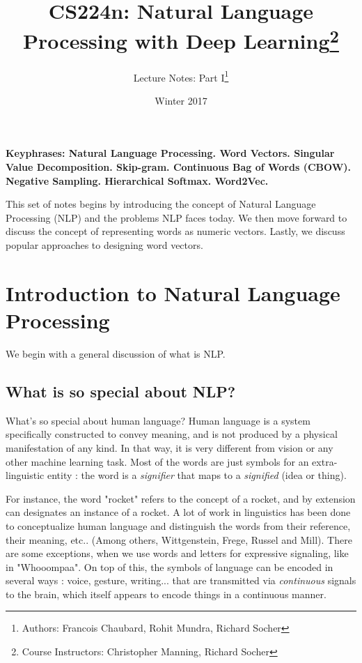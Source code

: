\documentclass[nobib]{tufte-handout}
\title{CS224n: Natural Language Processing with Deep Learning\thanks{Course Instructors: Christopher Manning, Richard Socher}}
\author[Francois Chaubard, Rohit Mundra, Richard Socher]{Lecture Notes: Part I\thanks{Authors: Francois Chaubard, Rohit Mundra, Richard Socher}}
\date{Winter 2017} %
\begin{document}
\maketitle%



\textbf{Keyphrases: Natural Language Processing. Word Vectors. Singular Value Decomposition. Skip-gram. Continuous Bag of Words (CBOW). Negative Sampling. Hierarchical Softmax. Word2Vec.}

This set of notes begins by introducing the concept of Natural Language Processing (NLP) and the problems NLP faces today. We then move forward to discuss the concept of representing words as numeric vectors. Lastly, we discuss popular approaches to designing word vectors.


\section{Introduction to Natural Language Processing}\label{sec:intro-nlp}

We begin with a general discussion of what is NLP.
\subsection{What is so special about NLP?}
What's so special about human language? Human language is a system specifically constructed to convey meaning, and is not produced by a physical manifestation of any kind. In that way, it is very different from vision or any other machine learning task. Most of the words are just symbols for an extra-linguistic entity : the word is a \emph{signifier} that maps to a \emph{signified} (idea or thing).


For instance, the word "rocket" refers to the concept of a rocket, and by extension can designates an instance of a rocket. A lot of work in linguistics has been done to conceptualize human language and distinguish the words from their reference, their meaning, etc.. (Among others, Wittgenstein, Frege, Russel and Mill). There are some exceptions, when we use words and letters for expressive signaling, like in "Whooompaa". On top of this, the symbols of language can be encoded in several ways : voice, gesture, writing... that are transmitted via \emph{continuous} signals to the brain, which itself appears to encode things in a continuous manner. 
\end{document}
